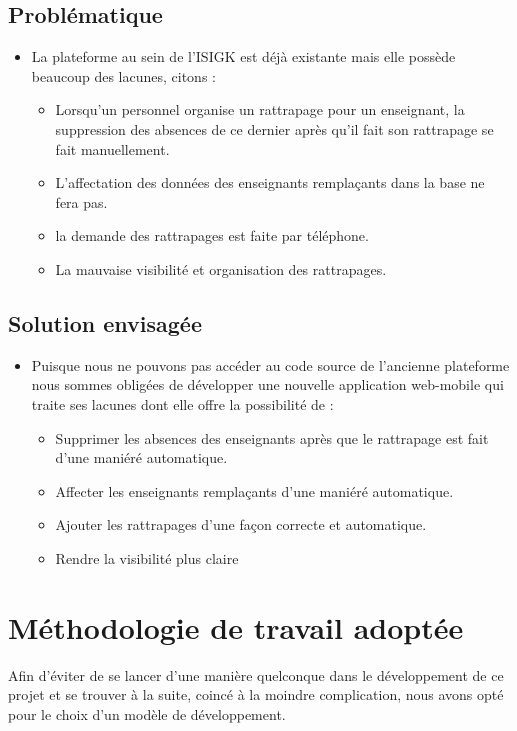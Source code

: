 \documentclass[12 pt]{report}
\begin{document}
\subsection{Problématique }
\begin{itemize}[font=\color{black} \Large, label=]
\item La plateforme au sein de l'ISIGK est déjà existante mais elle possède beaucoup des lacunes, citons :
\begin{itemize}[font=\color{red} \Large, label=]

	\item Lorsqu’un personnel organise un rattrapage pour un enseignant, la suppression des absences de ce dernier après qu'il fait son rattrapage se fait manuellement.
	\item L'affectation  des données des enseignants remplaçants dans la base ne fera pas.
	\item la demande des rattrapages est faite par téléphone.

	\item La mauvaise visibilité et organisation des rattrapages.
\end{itemize}
\end{itemize}
\subsection{Solution envisagée}
\begin{itemize}[font=\color{black} \Large, label=]
\item Puisque nous ne pouvons pas accéder au code source de l’ancienne plateforme nous sommes obligées de développer une nouvelle application web-mobile qui traite ses lacunes dont elle offre la possibilité de : 
\begin{itemize}[font=\color{green} \Large, label=]

	\item 	Supprimer les absences des enseignants après que le rattrapage est fait d’une maniéré automatique.
	\item 	Affecter les enseignants remplaçants d’une maniéré automatique.
	\item Ajouter les rattrapages d'une façon correcte et automatique.
	\item 	Rendre la visibilité plus claire 
\end{itemize}
\end{itemize}
\section{Méthodologie de travail adoptée }
Afin d’éviter de se lancer d’une manière quelconque dans le développement de ce projet et se trouver à la suite, coincé à la moindre complication, nous avons opté pour le choix d’un modèle de développement.
\end{document}
